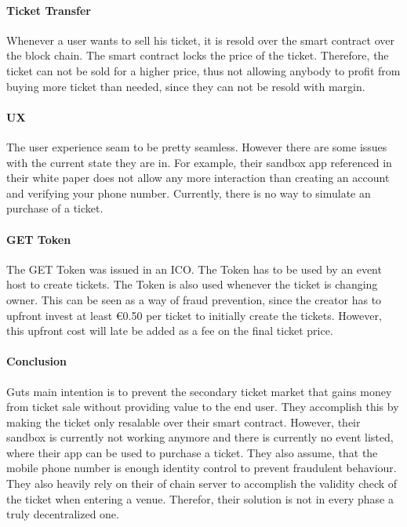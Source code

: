 \paragraph{Ticket Transfer}
Whenever a user wants to sell his ticket, it is resold over the smart contract over the block chain. The smart contract locks the price of the ticket. Therefore, the ticket can not be sold for a higher price, thus not allowing anybody to profit from buying more ticket than needed, since they can not be resold with margin.


\paragraph{UX}
The user experience seam to be pretty seamless. However there are some issues with the current state they are in. For example, their sandbox app referenced in their white paper does not allow any more interaction than creating an account and verifying your phone number. Currently, there is no way to simulate an purchase of a ticket.


\paragraph{GET Token}
The GET Token was issued in an ICO. The Token has to be used by an event host to create tickets. The Token is also used whenever the ticket is changing owner. This can be seen as a way of fraud prevention, since the creator has to upfront invest at least \euro0.50 per ticket to initially create the tickets. However, this upfront cost will late be added as a fee on the final ticket price.


\paragraph{Conclusion}
Guts main intention is to prevent the secondary ticket market that gains money from ticket sale without providing value to the  end user. They accomplish this by making the ticket only resalable over their smart contract. However, their sandbox is currently not working anymore and there is currently no event listed, where their app can be used to purchase a ticket. They also assume, that the mobile phone number is enough identity control to prevent fraudulent behaviour. They also heavily rely on their of chain server to accomplish the validity check of the ticket when entering a venue. Therefor, their solution is not in every phase a truly decentralized one.
